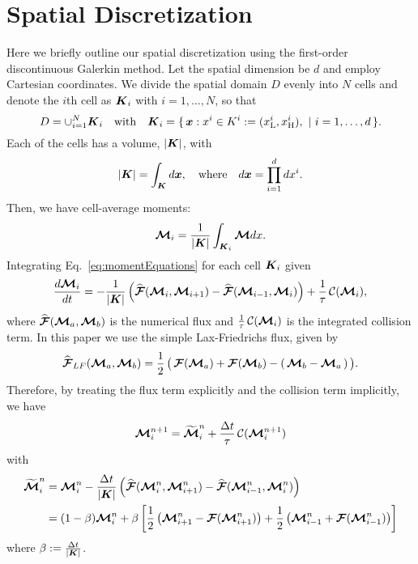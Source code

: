 \section{Spatial Discretization}\label{se:SpacialDiscretization}
Here we briefly outline our spatial discretization using the first-order discontinuous Galerkin method.
Let the spatial dimension be $d$ and employ Cartesian coordinates.
We divide the spatial domain $D$ evenly into $N$ cells and denote the $i$th cell as $\boldsymbol{K}_{i}$ with $i = 1,\ldots,N$, so that
\begin{equation*}
D = \cup_{i = 1}^{N} \boldsymbol{K}_{i} \quad \text{with} \quad
  \boldsymbol{K}_{i}=\{\,\boldsymbol{x} : x^{i} \in K^{i} := (x_{{\rm L}}^{i},x_{{\rm H}}^{i}),~|~i=1,\ldots,d\,\}.
\end{equation*}
Each of the cells has a volume, $|\boldsymbol{K}|$, with
\begin{equation*}
  |\boldsymbol{K}| = \int_{\boldsymbol{K}}d\boldsymbol{x}, \quad\text{where}\quad d\boldsymbol{x} = \prod_{i=1}^{d}dx^{i}.  
\end{equation*}
Then, we have cell-average moments:
\begin{equation}
\boldsymbol{\mathcal{M}}_{i} = \dfrac{1}{|\boldsymbol{K}|} \int_{\boldsymbol{K}_i}\boldsymbol{\mathcal{M}} dx.
\end{equation}
Integrating Eq.~\eqref{eq:momentEquations} for each cell $\boldsymbol{K}_{i}$ given
\begin{equation}
\dfrac{d \boldsymbol{\mathcal{M}}_{i}}{d t} = - \dfrac{1}{|\boldsymbol{K}|} \left( \widehat{\boldsymbol{\mathcal{F}}}(\boldsymbol{\mathcal{M}}_{i},\boldsymbol{\mathcal{M}}_{i+1}) -  \widehat{\boldsymbol{\mathcal{F}}}(\boldsymbol{\mathcal{M}}_{i-1},\boldsymbol{\mathcal{M}}_{i})\right) + \frac{1}{\tau}\,\mathcal{C}(\boldsymbol{\mathcal{M}}_{i}),
\label{eq:SemiDiscretizatedMomentEquation}
\end{equation}
where $\widehat{\boldsymbol{\mathcal{F}}}(\boldsymbol{\mathcal{M}}_{a},\boldsymbol{\mathcal{M}}_{b})$ is the numerical flux and $\frac{1}{\tau}\,\mathcal{C}(\boldsymbol{\mathcal{M}}_{i})$ is the integrated collision term.
In this paper we use the simple Lax-Friedrichs flux, given by
\begin{equation}
  \widehat{\boldsymbol{\mathcal{F}}}_{LF}(\boldsymbol{\mathcal{M}}_{a},\boldsymbol{\mathcal{M}}_{b})
  =\frac{1}{2}\,\big(\,\boldsymbol{\mathcal{F}}(\boldsymbol{\mathcal{M}}_{a})+\boldsymbol{\mathcal{F}}(\boldsymbol{\mathcal{M}}_{b})-(\,\boldsymbol{\mathcal{M}}_{b}-\boldsymbol{\mathcal{M}}_{a}\,)\,\big).
  \label{eq:Lax-Friedrichs flux}
\end{equation}
Therefore, by treating the flux term explicitly and the collision term implicitly, we have
\begin{align}
\boldsymbol{\mathcal{M}}_{i}^{n+1} = \widetilde{\boldsymbol{\mathcal{M}}}^{n}_{i} + \frac{\Delta t}{\tau}\,\mathcal{C}(\boldsymbol{\mathcal{M}}^{n+1}_{i})
\label{eq:MomentIMEX}
\end{align}
with
\begin{align}
\widetilde{\boldsymbol{\mathcal{M}}}^{n}_{i} 
& = \boldsymbol{\mathcal{M}}_{i}^{n} - \dfrac{\Delta t}{|\boldsymbol{K}|} \left( \widehat{\boldsymbol{\mathcal{F}}}(\boldsymbol{\mathcal{M}}^{n}_{i},\boldsymbol{\mathcal{M}}^{n}_{i+1}) -  \widehat{\boldsymbol{\mathcal{F}}}(\boldsymbol{\mathcal{M}}^{n}_{i-1},\boldsymbol{\mathcal{M}}^{n}_{i})\right)\nonumber \\
& = (1-\beta)\boldsymbol{\mathcal{M}}_{i}^{n} + \beta\left[ \frac{1}{2}\left( \boldsymbol{\mathcal{M}}^{n}_{i+1}-\boldsymbol{\mathcal{F}}(\boldsymbol{\mathcal{M}}^{n}_{i+1})\right)  + \frac{1}{2}\left( \boldsymbol{\mathcal{M}}^{n}_{i-1}+\boldsymbol{\mathcal{F}}(\boldsymbol{\mathcal{M}}^{n}_{i-1})\right)\right]
\label{eq:widetildeM}
\end{align}
where $\beta := \frac{\Delta t}{|\boldsymbol{K}|}$.

